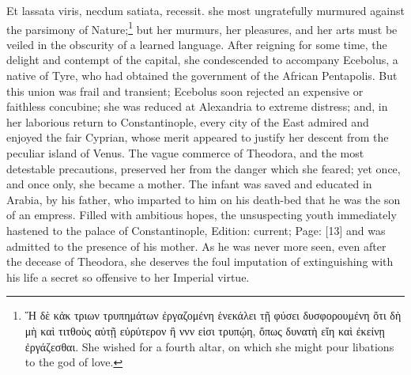 {Et lassata viris, necdum satiata, recessit.} she most ungratefully murmured against the parsimony of Nature;\footnote{\textgreek{\texthebrew{Ἥ} δ\texthebrew{ὲ} κ\texthebrew{ἀ}κ τριων τρυπημάτων \texthebrew{ἐ}ργαζομένη \texthebrew{ἑ}νεκάλει τ\texthebrew{ῇ} φύσει δυσφορουμένη \texthebrew{ὄ}τι δ\texthebrew{ὴ} μ\texthebrew{ὴ} κα\texthebrew{ὶ} τιτθο\texthebrew{ὺ}ς α\texthebrew{ὐ}τ\texthebrew{ῇ} ε\texthebrew{ὐ}ρύτερον \texthebrew{ἢ} ννν ε\texthebrew{ἱ}σι τρυπ\texthebrew{ῴ}η, \texthebrew{ὄ}πως δυνατ\texthebrew{ὴ} ε\texthebrew{ἴ}η κα\texthebrew{ὶ ἐ}κείν\texthebrew{ῃ ἐ}ργάζεσθαι}. She wished for a fourth altar, on which she might pour libations to the god of love.} but her murmurs, her pleasures, and her arts must be veiled in the obscurity of a learned language. After reigning for some time, the delight and contempt of the capital, she condescended to accompany Ecebolus, a native of Tyre, who had obtained the government of the African Pentapolis. But this union was frail and transient; Ecebolus soon rejected an expensive or faithless concubine; she was reduced at Alexandria to extreme distress; and, in her laborious return to Constantinople, every city of the East admired and enjoyed the fair Cyprian, whose merit appeared to justify her descent from the peculiar island of Venus. The vague commerce of Theodora, and the most detestable precautions, preserved her from the danger which she feared; yet once, and once only, she became a mother. The infant was saved and educated in Arabia, by his father, who imparted to him on his death-bed that he was the son of an empress. Filled with ambitious hopes, the unsuspecting youth immediately hastened to the palace of Constantinople, Edition: current; Page: [13] and was admitted to the presence of his mother. As he was never more seen, even after the decease of Theodora, she deserves the foul imputation of extinguishing with his life a secret so offensive to her Imperial virtue.

